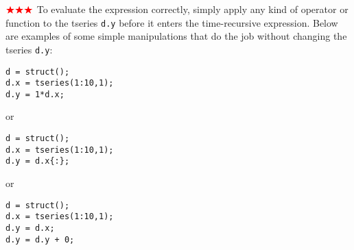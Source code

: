 ${\color{red}\bigstar\bigstar\bigstar}$ To evaluate the expression correctly, simply apply any kind
of operator or function to the tseries \texttt{d.y} before it enters the
time-recursive expression. Below are examples of some simple
manipulations that do the job without changing the tseries \texttt{d.y}:

\begin{verbatim}
d = struct();
d.x = tseries(1:10,1);
d.y = 1*d.x;
\end{verbatim}

or

\begin{verbatim}
d = struct();
d.x = tseries(1:10,1);
d.y = d.x{:};
\end{verbatim}

or

\begin{verbatim}
d = struct();
d.x = tseries(1:10,1);
d.y = d.x;
d.y = d.y + 0;
\end{verbatim}



